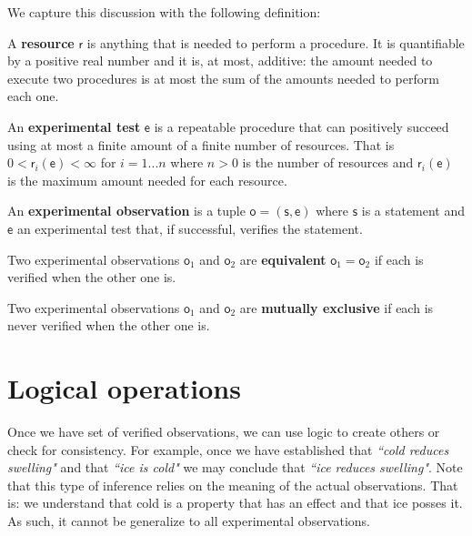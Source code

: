 \documentclass[11pt,letterpaper,fleqn]{memoir} %
\begin{document}
We capture this discussion with the following definition:

\begin{defn}
	A \textbf{resource} $\mathsf{r}$ is anything that is needed to perform a procedure. It is quantifiable by a positive real number and it is, at most, additive: the amount needed to execute two procedures is at most the sum of the amounts needed to perform each one.
\end{defn}

\begin{defn}
	An \textbf{experimental test} $\mathsf{e}$ is a repeatable procedure that can positively succeed using at most a finite amount of a finite number of resources. That is $0 < \mathsf{r}_i(\mathsf{e}) < \infty$ for $i=1...n$ where $n>0$ is the number of resources and $\mathsf{r}_i(\mathsf{e})$ is the maximum amount needed for each resource.
\end{defn}

\begin{defn}
	An \textbf{experimental observation} is a tuple $\mathsf{o} = (\mathsf{s}, \mathsf{e})$ where $\mathsf{s}$ is a statement and $\mathsf{e}$ an experimental test that, if successful, verifies the statement.
\end{defn}

\begin{defn}
	Two experimental observations $\mathsf{o}_1$ and $\mathsf{o}_2$ are \textbf{equivalent} $\mathsf{o}_1 = \mathsf{o}_2$ if each is verified when the other one is.
\end{defn}

\begin{defn}
	Two experimental observations $\mathsf{o}_1$ and $\mathsf{o}_2$ are \textbf{mutually exclusive} if each is never verified when the other one is.
\end{defn}

\section{Logical operations}

Once we have set of verified observations, we can use logic to create others or check for consistency. For example, once we have established that \emph{``cold reduces swelling"} and that \emph{``ice is cold"} we may conclude that \emph{``ice 
reduces swelling"}. Note that this type of inference relies on the meaning of the actual observations. That is: we understand that cold is a property that has an effect and that ice posses it. As such, it cannot be generalize to all experimental observations.
\end{document}
